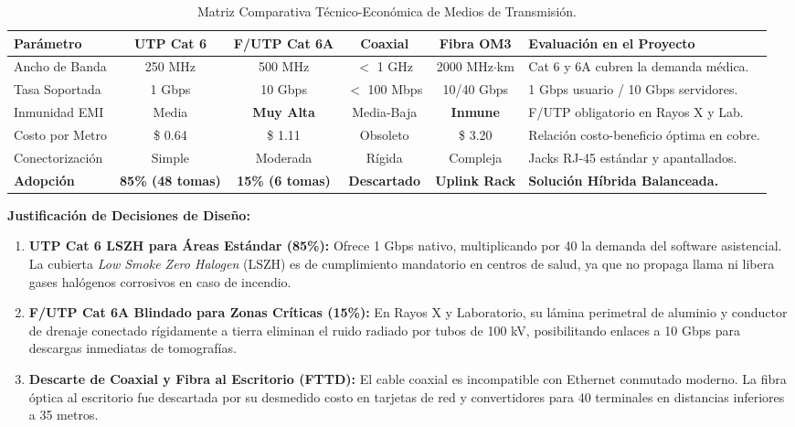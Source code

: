 \documentclass[11pt,a4paper]{article}
\begin{document}
\begin{table}[h!]
\centering
\small
\caption{Matriz Comparativa Técnico-Económica de Medios de Transmisión.}
\label{tab:medios}
\begin{tabularx}{\textwidth}{l c c c c X}
\toprule
\textbf{Parámetro} & \textbf{UTP Cat 6} & \textbf{F/UTP Cat 6A} & \textbf{Coaxial} & \textbf{Fibra OM3} & \textbf{Evaluación en el Proyecto} \\
\midrule
Ancho de Banda & 250 MHz & 500 MHz & $<$ 1 GHz & 2000 MHz$\cdot$km & Cat 6 y 6A cubren la demanda médica. \\
Tasa Soportada & 1 Gbps & 10 Gbps & $<$ 100 Mbps & 10/40 Gbps & 1 Gbps usuario / 10 Gbps servidores. \\
Inmunidad EMI & Media & \textbf{Muy Alta} & Media-Baja & \textbf{Inmune} & F/UTP obligatorio en Rayos X y Lab. \\
Costo por Metro & \$ 0.64 & \$ 1.11 & Obsoleto & \$ 3.20 & Relación costo-beneficio óptima en cobre. \\
Conectorización & Simple & Moderada & Rígida & Compleja & Jacks RJ-45 estándar y apantallados. \\
\textbf{Adopción} & \textbf{85\% (48 tomas)} & \textbf{15\% (6 tomas)} & \textbf{Descartado} & \textbf{Uplink Rack} & \textbf{Solución Híbrida Balanceada.} \\
\bottomrule
\end{tabularx}
\end{table}

\textbf{Justificación de Decisiones de Diseño:}
\begin{enumerate}[noitemsep]
    \item \textbf{UTP Cat 6 LSZH para Áreas Estándar (85\%):} Ofrece 1 Gbps nativo, multiplicando por 40 la demanda del software asistencial. La cubierta \textit{Low Smoke Zero Halogen} (LSZH) es de cumplimiento mandatorio en centros de salud, ya que no propaga llama ni libera gases halógenos corrosivos en caso de incendio.
    \item \textbf{F/UTP Cat 6A Blindado para Zonas Críticas (15\%):} En Rayos X y Laboratorio, su lámina perimetral de aluminio y conductor de drenaje conectado rígidamente a tierra eliminan el ruido radiado por tubos de 100 kV, posibilitando enlaces a 10 Gbps para descargas inmediatas de tomografías.
    \item \textbf{Descarte de Coaxial y Fibra al Escritorio (FTTD):} El cable coaxial es incompatible con Ethernet conmutado moderno. La fibra óptica al escritorio fue descartada por su desmedido costo en tarjetas de red y convertidores para 40 terminales en distancias inferiores a 35 metros.
\end{enumerate}
\end{document}
